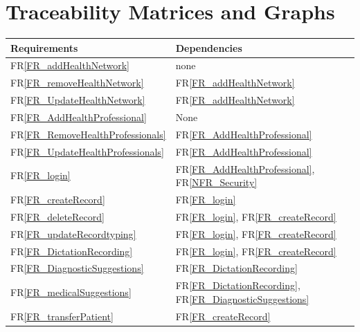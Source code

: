 \documentclass[12pt]{article}
\begin{document}
\section{Traceability Matrices and Graphs}
\begin{tabularx}{\textwidth}{p{3cm}p{2cm}X} 

  \toprule {\bf Requirements} & {\bf Dependencies}\\ 

  \midrule 

  FR\ref{FR_addHealthNetwork} &   none  \\   

  FR\ref{FR_removeHealthNetwork} &  FR\ref{FR_addHealthNetwork}\\   

  FR\ref{FR_UpdateHealthNetwork} &  FR\ref{FR_addHealthNetwork} \\  

  FR\ref{FR_AddHealthProfessional} &  None  \\   

  FR\ref{FR_RemoveHealthProfessionals} &  FR\ref{FR_AddHealthProfessional} \\  

  FR\ref{FR_UpdateHealthProfessionals} &  FR\ref{FR_AddHealthProfessional} \\  

  FR\ref{FR_login} &  FR\ref{FR_AddHealthProfessional}, FR\ref{NFR_Security}  \\     

  FR\ref{FR_createRecord} & FR\ref{FR_login} \\  

  FR\ref{FR_deleteRecord} & FR\ref{FR_login}, FR\ref{FR_createRecord} \\  

  FR\ref{FR_updateRecordtyping} & FR\ref{FR_login}, FR\ref{FR_createRecord} \\     

  FR\ref{FR_DictationRecording} & FR\ref{FR_login}, FR\ref{FR_createRecord} \\  

  FR\ref{FR_DiagnosticSuggestions} &  FR\ref{FR_DictationRecording} \\       

  FR\ref{FR_medicalSuggestions} & FR\ref{FR_DictationRecording}, FR\ref{FR_DiagnosticSuggestions}  \\  

  FR\ref{FR_transferPatient} &  FR\ref{FR_createRecord}\\  


\end{tabularx}
\end{document}
